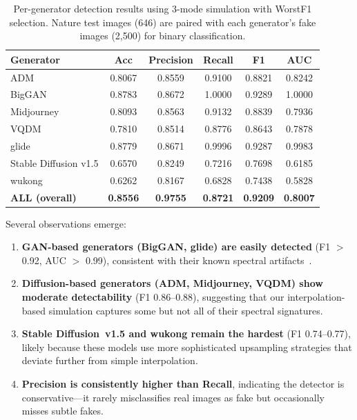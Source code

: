 \documentclass[11pt,a4paper]{article}
\begin{document}
\begin{table}[t]
\centering
\caption{Per-generator detection results using 3-mode simulation with WorstF1 selection. Nature test images (646) are paired with each generator's fake images (2,500) for binary classification.}
\label{tab:per-gen}
\begin{tabular}{lccccc}
\toprule
Generator & Acc & Precision & Recall & F1 & AUC \\
\midrule
ADM & 0.8067 & 0.8559 & 0.9100 & 0.8821 & 0.8242 \\
BigGAN & 0.8783 & 0.8672 & 1.0000 & 0.9289 & 1.0000 \\
Midjourney & 0.8093 & 0.8563 & 0.9132 & 0.8839 & 0.7936 \\
VQDM & 0.7810 & 0.8514 & 0.8776 & 0.8643 & 0.7878 \\
glide & 0.8779 & 0.8671 & 0.9996 & 0.9287 & 0.9983 \\
Stable Diffusion v1.5 & 0.6570 & 0.8249 & 0.7216 & 0.7698 & 0.6185 \\
wukong & 0.6262 & 0.8167 & 0.6828 & 0.7438 & 0.5828 \\
\midrule
\textbf{ALL (overall)} & \textbf{0.8556} & \textbf{0.9755} & \textbf{0.8721} & \textbf{0.9209} & \textbf{0.8007} \\
\bottomrule
\end{tabular}
\end{table}

Several observations emerge:
\begin{enumerate}[nosep]
    \item \textbf{GAN-based generators (BigGAN, glide) are easily detected} (F1 $>$ 0.92, AUC $>$ 0.99), consistent with their known spectral artifacts~\cite{frank2020leveraging}.
    \item \textbf{Diffusion-based generators (ADM, Midjourney, VQDM) show moderate detectability} (F1 0.86--0.88), suggesting that our interpolation-based simulation captures some but not all of their spectral signatures.
    \item \textbf{Stable Diffusion~v1.5 and wukong remain the hardest} (F1 0.74--0.77), likely because these models use more sophisticated upsampling strategies that deviate further from simple interpolation.
    \item \textbf{Precision is consistently higher than Recall}, indicating the detector is conservative---it rarely misclassifies real images as fake but occasionally misses subtle fakes.
\end{enumerate}
\end{document}
